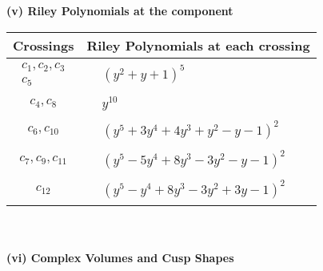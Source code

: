 \documentclass[1p]{elsarticle_modified}
\theoremstyle{definition}
\begin{document}
\newpage\renewcommand{\arraystretch}{1}
\flushleft \textbf{(v) Riley Polynomials at the component}\newline \\
\begin{tabular}{m{50pt}|m{274pt}}
Crossings & \hspace{64pt}Riley Polynomials at each crossing \\
\hline $$\begin{aligned}c_{1},c_{2},c_{3}\\c_{5}\end{aligned}$$&$\begin{aligned}
&(y^2+y+1)^5
\end{aligned}$\\
\hline $$\begin{aligned}c_{4},c_{8}\end{aligned}$$&$\begin{aligned}
&y^{10}
\end{aligned}$\\
\hline $$\begin{aligned}c_{6},c_{10}\end{aligned}$$&$\begin{aligned}
&(y^5+3 y^4+4 y^3+y^2- y-1)^2
\end{aligned}$\\
\hline $$\begin{aligned}c_{7},c_{9},c_{11}\end{aligned}$$&$\begin{aligned}
&(y^5-5 y^4+8 y^3-3 y^2- y-1)^2
\end{aligned}$\\
\hline $$\begin{aligned}c_{12}\end{aligned}$$&$\begin{aligned}
&(y^5- y^4+8 y^3-3 y^2+3 y-1)^2
\end{aligned}$\\
\hline
\end{tabular}\\~\\
\newpage\flushleft \textbf{(vi) Complex Volumes and Cusp Shapes}
\end{document}
